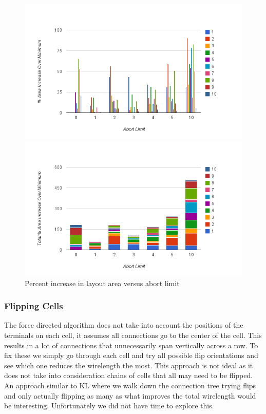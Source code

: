 \documentclass[10pt]{article}
\begin{document}
        \begin{figure}[H]
            \centering
            \begin{minipage}{.5\textwidth}
                \centering
                \includegraphics[width=0.98\linewidth]{./abort_limit.png}
            \end{minipage}%
            \begin{minipage}{.5\textwidth}
                \centering
                \includegraphics[width=0.98\linewidth]{./abort_limit_stacked.png}
            \end{minipage}
            \caption{Percent increase in layout area versus abort limit}
        \end{figure}

        \subsubsection{Flipping Cells}

        The force directed algorithm does not take into account the positions
        of the terminals on each cell, it assumes all connections go to the
        center of the cell. This results in a lot of connections that
        unnecessarily span vertically across a row. To fix these we simply go
        through each cell and try all possible flip orientations and see which
        one reduces the wirelength the most. This approach is not ideal as it
        does not take into consideration chains of cells that all may need to
        be flipped. An approach similar to KL where we walk down the connection
        tree trying flips and only actually flipping as many as what improves
        the total wirelength would be interesting. Unfortunately we did not
        have time to explore this.
\end{document}
